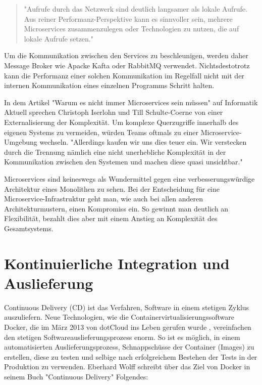 \begin{quote}
"Aufrufe durch das Netzwerk sind deutlich langsamer als lokale Aufrufe.
Aus reiner Performanz-Perspektive kann es sinnvoller sein, mehrere Microservices
zusammenzulegen oder Technologien zu nutzen, die auf lokale Aufrufe setzen."\cite[S. 65, 3. Absatz]{MicroservicesBook}
\end{quote}

Um die Kommunikation zwischen den Services zu beschleunigen, werden daher Message Broker wie
Apacke Kafta oder RabbitMQ verwendet. \mbox{Nichtsdestotrotz} kann die Performanz einer solchen
Kommunikation im Regelfall nicht mit der internen Kommunikation eines einzelnen Programms Schritt halten.

In dem Artikel "Warum es nicht immer Microservices sein müssen" auf Informatik Aktuell
sprechen Christoph Iserlohn und Till Schulte-Coerne von einer Externalisierung der Komplexität.
Um komplexe Querzugriffe innerhalb des eigenen Systems zu vermeiden, würden Teams oftmals 
zu einer Microservice-Umgebung wechseln. "Allerdings kaufen wir uns dies teuer ein.
Wir verstecken durch die Trennung nämlich eine nicht unerhebliche Komplexität in
der Kommunikation zwischen den Systemen und machen diese quasi unsichtbar."\cite[Paragraph 11]{InformatikAktuellWarumNichtImmerMicroservices}

Microservices sind keineswegs als Wundermittel gegen eine verbesserungswürdige Architektur eines
Monolithen zu sehen. Bei der Entscheidung für eine Microservice-Infrastruktur geht man, wie
auch bei allen anderen Architekturmustern, einen Kompromiss ein. So gewinnt man deutlich
an Flexibilität, bezahlt dies aber mit einem Anstieg an Komplexität des Gesamtsystems.

\section{Kontinuierliche Integration und Auslieferung}
\label{sec:kontinuierlicheintegrationundauslieferung}
Continuous Delivery (CD) ist das Verfahren, Software in einem stetigen Zyklus auszuliefern.
Neue Technologien, wie die Containervirtualisierungssoftware Docker,
die im März 2013 von dotCloud ins Leben gerufen wurde \cite{DockerAbout2014}, vereinfachen
den stetigen Softwareauslieferungsprozess enorm. So ist es möglich, in einem automatisierten
Auslieferungsprozess, Schnappschüsse der Container (Images) zu erstellen, diese zu testen und selbige nach erfolgreichem
Bestehen der Tests in der Produktion zu verwenden. Eberhard Wolff schreibt über das Ziel von Docker in
seinem Buch "Continuous Delivery" Folgendes:

